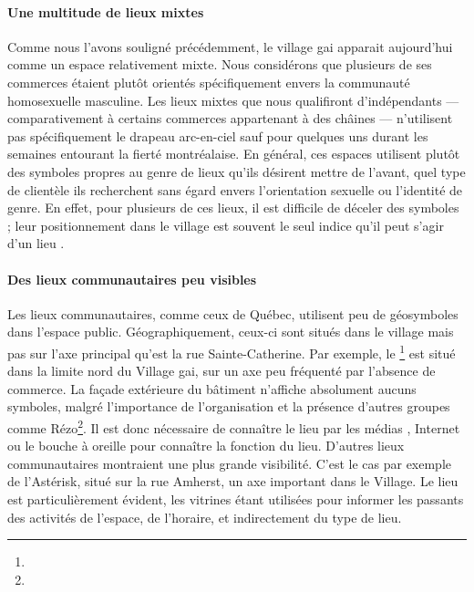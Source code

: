 \paragraph{Une multitude de lieux mixtes}
Comme nous l'avons souligné précédemment, le village gai apparait aujourd'hui comme un espace relativement mixte.
Nous considérons que plusieurs de ses commerces étaient plutôt orientés spécifiquement envers la communauté homosexuelle masculine.
Les lieux mixtes que nous qualifiront d'indépendants --- comparativement à certains commerces appartenant à des châines --- n'utilisent pas spécifiquement le drapeau arc-en-ciel sauf pour quelques uns durant les semaines entourant la fierté montréalaise.
En général, ces espaces utilisent plutôt des symboles propres au genre de lieux qu'ils désirent mettre de l'avant, quel type de clientèle ils recherchent sans égard envers l'orientation sexuelle ou l'identité de genre.
En effet, pour plusieurs de ces lieux, il est difficile de déceler des symboles \lgbt{}; leur positionnement dans le village est souvent le seul indice qu'il peut s'agir d'un lieu \lgbt{}.

\paragraph{Des lieux communautaires peu visibles}
Les lieux communautaires, comme ceux de Québec, utilisent peu de géosymboles dans l'espace public.
Géographiquement, ceux-ci sont situés dans le village mais pas sur l'axe principal qu'est la rue Sainte-Catherine.
Par exemple, le \ccglm{}\footnote{} est situé dans la limite nord du Village gai, sur un axe peu fréquenté par l'absence de commerce.
La façade extérieure du bâtiment n'affiche absolument aucuns symboles, malgré l'importance de l'organisation et la présence d'autres groupes \lgbt{} comme Rézo\footnote{}.
Il est donc nécessaire de connaître le lieu par les médias \lgbt{}, Internet ou le bouche à oreille pour connaître la fonction du lieu.
D'autres lieux communautaires montraient une plus grande visibilité.
C'est le cas par exemple de l'Astérisk, situé sur la rue Amherst, un axe important dans le Village.
Le lieu est particulièrement évident, les vitrines étant utilisées pour informer les passants des activités de l'espace, de l'horaire, et indirectement du type de lieu.

